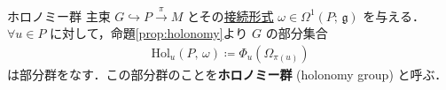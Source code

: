 \documentclass[geometry_main]{subfiles}
\begin{document}
\begin{mydef}[label=def:holonomy]{ホロノミー群}
    主束 $G \hookrightarrow P \xrightarrow{\pi} M$ とその\hyperref[def:connection]{接続形式} $\omega \in \Omega^1(P;\, \mathfrak{g})$ を与える．
    $\forall u \in P$ に対して，命題\ref{prop:holonomy}より $G$ の部分集合
    \begin{align}
        \mathrm{Hol}_u(P,\, \omega) \coloneqq \Phi_u (\Omega_{\pi(u)})
    \end{align}
    は部分群をなす．この部分群のことを\textbf{ホロノミー群} (holonomy group) と呼ぶ．
\end{mydef}


    
\end{document}
